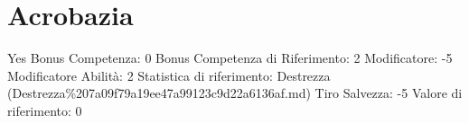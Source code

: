 \section{Acrobazia}\label{acrobazia}

\begin{description}
\tightlist
\item[Tags: ABI]
Yes Bonus Competenza: 0 Bonus Competenza di Riferimento: 2 Modificatore:
-5 Modificatore Abilità: 2 Statistica di riferimento: Destrezza
(Destrezza\%207a09f79a19ee47a99123c9d22a6136af.md) Tiro Salvezza: -5
Valore di riferimento: 0
\end{description}

